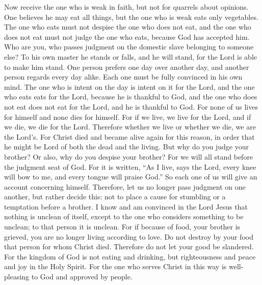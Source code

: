 \begin{biblechapter} %
 Now receive the one who is weak in faith, but not for quarrels about opinions.
\verse One believes he may eat all things, but the one who is weak eats only vegetables.
\verse The one who eats must not despise the one who does not eat, and the one who does not eat must not judge the one who eats, because God has accepted him.
\verse Who are you, who passes judgment on the domestic slave belonging to someone else? To his own master he stands or falls, and he will stand, for the Lord is able to make him stand.
\verse One person prefers one day over another day, and another person regards every day alike. Each one must be fully convinced in his own mind.
\verse The one who is intent on the day is intent on it for the Lord, and the one who eats eats for the Lord, because he is thankful to God, and the one who does not eat does not eat for the Lord, and he is thankful to God.
\verse For none of us lives for himself and none dies for himself.
\verse For if we live, we live for the Lord, and if we die, we die for the Lord. Therefore whether we live or whether we die, we are the Lord’s.
\verse For Christ died and became alive again for this reason, in order that he might be Lord of both the dead and the living.
\verse But why do you judge your brother? Or also, why do you despise your brother? For we will all stand before the judgment seat of God.
\verse For it is written, “As I live, says the Lord, every knee will bow to me, 
and every tongue will praise God.”
\verse So each one of us will give an account concerning himself.
\verse Therefore, let us no longer pass judgment on one another, but rather decide this: not to place a cause for stumbling or a temptation before a brother.
\verse I know and am convinced in the Lord Jesus that nothing is unclean of itself, except to the one who considers something to be unclean; to that person it is unclean.
\verse For if because of food, your brother is grieved, you are no longer living according to love. Do not destroy by your food that person for whom Christ died.
\verse Therefore do not let your good be slandered.
\verse For the kingdom of God is not eating and drinking, but righteousness and peace and joy in the Holy Spirit.
\verse For the one who serves Christ in this way is well-pleasing to God and approved by people.

\end{biblechapter}
